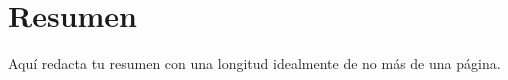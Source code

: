 \section*{Resumen} \label{sec:resumen}

Aquí redacta tu resumen con una longitud idealmente de no más de una página.